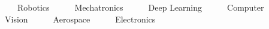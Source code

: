 
\begin{cventries}
\bullet ~~~Robotics~~~\bullet ~~~Mechatronics~~~\bullet ~~~Deep Learning~~~\bullet ~~~Computer Vision~~~\bullet ~~~Aerospace~~~\bullet ~~~Electronics~~~



\end{cventries}